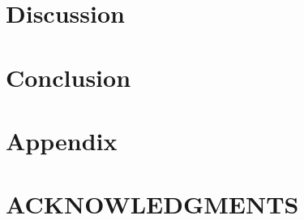 \documentclass[reprint,english,notitlepage]{revtex4-2}
\begin{document}
\section{Discussion} \label{sec: discussion}


\section{Conclusion} \label{sec: conclusion}

\section{Appendix} \label{sec: appendix}

\section*{ACKNOWLEDGMENTS}

\newpage
\end{document}

